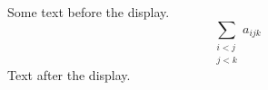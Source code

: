 \documentclass[12pt]{article}
\begin{document}
Some text before the display.
\[ \sum_{\begin{matrix} i < j \\ j < k \end{matrix}} a_{ijk} \]
Text after the display.
\end{document}
